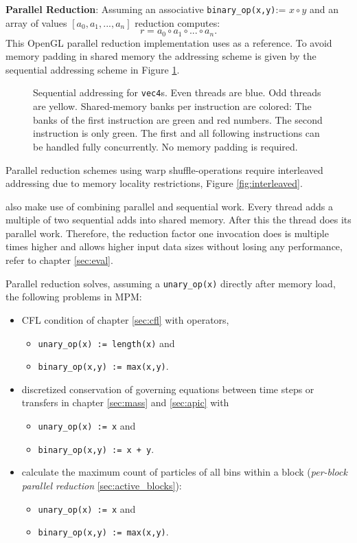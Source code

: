 \documentclass[m,times]{cgMA}
\begin{document}
\textbf{Parallel Reduction}: Assuming an associative \texttt{binary\_op(x,y)}:= $x \circ y$ and an array of values $\left[a_0,a_1, ... ,a_n\right]$ reduction computes:
\begin{equation}
  r = a_0 \circ a_1 \circ ... \circ a_n.
\end{equation}
This OpenGL parallel reduction implementation uses \cite{NVIDIA:PARALLEL_REDUCTION} as a reference. To avoid memory padding in shared memory the addressing scheme is given by the sequential addressing scheme in Figure \ref{fig:sequential}.
\begin{figure}[htbp]
    \centering
  
  \caption{Sequential addressing for \texttt{vec4}s. Even threads are blue. Odd threads are yellow. Shared-memory banks per instruction are colored: The banks of the first instruction are green and red numbers. The second instruction is only green. The first and all following instructions can be handled fully concurrently. No memory padding is required.}
\label{fig:sequential}
\end{figure}

Parallel reduction schemes using warp shuffle-operations require interleaved addressing due to memory locality restrictions, Figure \ref{fig:interleaved}. \cite{NVIDIA:SHUFFLE}

\cite{NVIDIA:PARALLEL_REDUCTION} also make use of combining parallel and sequential work. Every thread adds a multiple of two sequential adds into shared memory. After this the thread does its parallel work. Therefore, the reduction factor one invocation does is multiple times higher and allows higher input data sizes without losing any performance, refer to chapter \ref{sec:eval}.

Parallel reduction solves, assuming a \texttt{unary\_op(x)} directly after memory load, the following problems in MPM:
\begin{itemize}
  \item CFL condition of chapter \ref{sec:cfl} with operators,
  \begin{itemize}
  \item \texttt{unary\_op(x) := length(x)} and
  \item \texttt{binary\_op(x,y) := max(x,y)}.
  \end{itemize}
\item discretized conservation of governing equations between time steps or transfers in chapter \ref{sec:mass} and \ref{sec:apic} with
\begin{itemize}
  \item \texttt{unary\_op(x) := x} and
  \item \texttt{binary\_op(x,y) := x + y}.
  \end{itemize}
\item calculate the maximum count of particles of all bins within a block (\textit{per-block parallel reduction} \ref{sec:active_blocks}):
\begin{itemize}
  \item \texttt{unary\_op(x) := x} and
  \item \texttt{binary\_op(x,y) := max(x,y)}.
\end{itemize}
\end{itemize}
\end{document}
